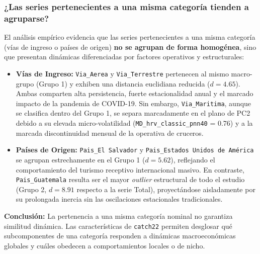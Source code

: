 \documentclass[11pt, a4paper]{article}
\begin{document}
\subsubsection{¿Las series pertenecientes a una misma categoría tienden a agruparse?}
El análisis empírico evidencia que las series pertenecientes a una misma categoría (vías de ingreso o países de origen) \textbf{no se agrupan de forma homogénea}, sino que presentan dinámicas diferenciadas por factores operativos y estructurales:
\begin{itemize}
    \item \textbf{Vías de Ingreso:} \texttt{Via\_Aerea} y \texttt{Via\_Terrestre} pertenecen al mismo macro-grupo (Grupo 1) y exhiben una distancia euclidiana reducida ($d = 4.65$). Ambas comparten alta persistencia, fuerte estacionalidad anual y el marcado impacto de la pandemia de COVID-19. Sin embargo, \texttt{Via\_Maritima}, aunque se clasifica dentro del Grupo 1, se separa marcadamente en el plano de PC2 debido a su elevada micro-volatilidad (\texttt{MD\_hrv\_classic\_pnn40} = 0.76) y a la marcada discontinuidad mensual de la operativa de cruceros.
    \item \textbf{Países de Origen:} \texttt{Pais\_El Salvador} y \texttt{Pais\_Estados Unidos de América} se agrupan estrechamente en el Grupo 1 ($d = 5.62$), reflejando el comportamiento del turismo receptivo internacional masivo. En contraste, \texttt{Pais\_Guatemala} resulta ser el mayor \textit{outlier} estructural de todo el estudio (Grupo 2, $d = 8.91$ respecto a la serie Total), proyectándose aisladamente por su prolongada inercia sin las oscilaciones estacionales tradicionales.
\end{itemize}
\textbf{Conclusión:} La pertenencia a una misma categoría nominal no garantiza similitud dinámica. Las características de \texttt{catch22} permiten desglosar qué subcomponentes de una categoría responden a dinámicas macroeconómicas globales y cuáles obedecen a comportamientos locales o de nicho.
\end{document}
